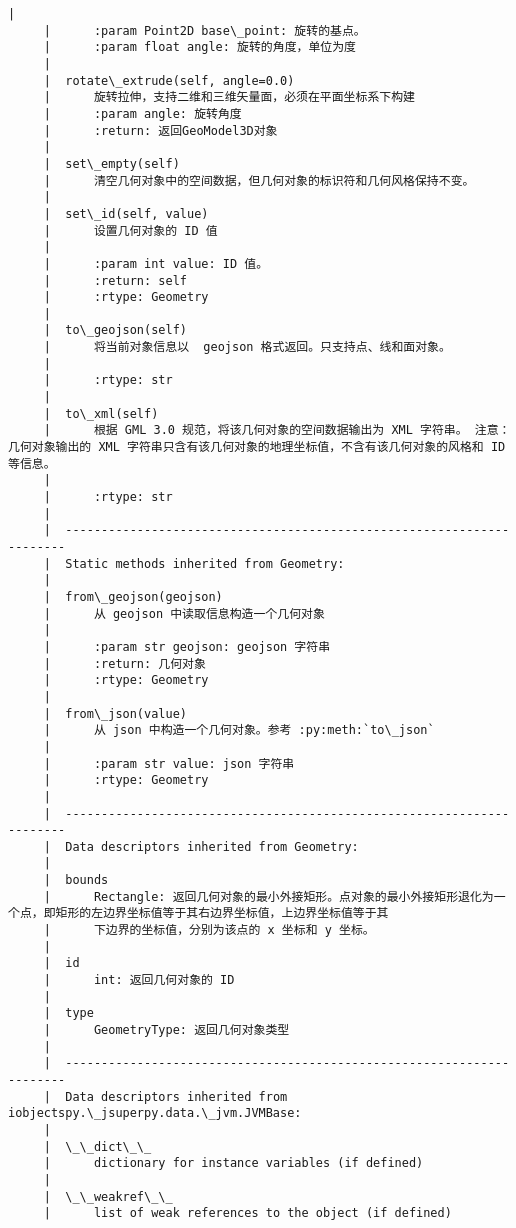 \documentclass[11pt]{article}
\begin{document}
\begin{Verbatim}[commandchars=\\\{\}]
     |      
     |      :param Point2D base\_point: 旋转的基点。
     |      :param float angle: 旋转的角度，单位为度
     |  
     |  rotate\_extrude(self, angle=0.0)
     |      旋转拉伸，支持二维和三维矢量面，必须在平面坐标系下构建
     |      :param angle: 旋转角度
     |      :return: 返回GeoModel3D对象
     |  
     |  set\_empty(self)
     |      清空几何对象中的空间数据，但几何对象的标识符和几何风格保持不变。
     |  
     |  set\_id(self, value)
     |      设置几何对象的 ID 值
     |      
     |      :param int value: ID 值。
     |      :return: self
     |      :rtype: Geometry
     |  
     |  to\_geojson(self)
     |      将当前对象信息以  geojson 格式返回。只支持点、线和面对象。
     |      
     |      :rtype: str
     |  
     |  to\_xml(self)
     |      根据 GML 3.0 规范，将该几何对象的空间数据输出为 XML 字符串。 注意：几何对象输出的 XML 字符串只含有该几何对象的地理坐标值，不含有该几何对象的风格和 ID 等信息。
     |      
     |      :rtype: str
     |  
     |  ----------------------------------------------------------------------
     |  Static methods inherited from Geometry:
     |  
     |  from\_geojson(geojson)
     |      从 geojson 中读取信息构造一个几何对象
     |      
     |      :param str geojson: geojson 字符串
     |      :return: 几何对象
     |      :rtype: Geometry
     |  
     |  from\_json(value)
     |      从 json 中构造一个几何对象。参考 :py:meth:`to\_json`
     |      
     |      :param str value: json 字符串
     |      :rtype: Geometry
     |  
     |  ----------------------------------------------------------------------
     |  Data descriptors inherited from Geometry:
     |  
     |  bounds
     |      Rectangle: 返回几何对象的最小外接矩形。点对象的最小外接矩形退化为一个点，即矩形的左边界坐标值等于其右边界坐标值，上边界坐标值等于其
     |      下边界的坐标值，分别为该点的 x 坐标和 y 坐标。
     |  
     |  id
     |      int: 返回几何对象的 ID
     |  
     |  type
     |      GeometryType: 返回几何对象类型
     |  
     |  ----------------------------------------------------------------------
     |  Data descriptors inherited from iobjectspy.\_jsuperpy.data.\_jvm.JVMBase:
     |  
     |  \_\_dict\_\_
     |      dictionary for instance variables (if defined)
     |  
     |  \_\_weakref\_\_
     |      list of weak references to the object (if defined)
    

\end{Verbatim}
\end{document}
